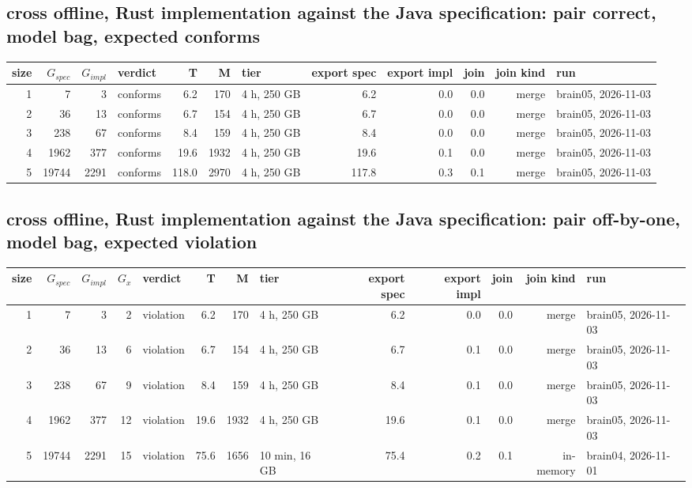 \documentclass[10pt]{article}
\begin{document}
\subsection*{cross offline, Rust implementation against the Java specification: pair \textsf{correct}, model bag, expected conforms}
\begin{longtable}{@{}rrrlrrlrrrrl@{}}
\toprule
size & $G_{\mathit{spec}}$ & $G_{\mathit{impl}}$ & verdict & T & M & tier & export spec & export impl & join & join kind & run \\
\midrule
\endhead
\color{blue} 1 & 7 & 3 & conforms & 6.2 & 170 & 4 h, 250 GB & 6.2 & 0.0 & 0.0 & merge & brain05, 2026-11-03 \\
\color{blue} 2 & 36 & 13 & conforms & 6.7 & 154 & 4 h, 250 GB & 6.7 & 0.0 & 0.0 & merge & brain05, 2026-11-03 \\
\color{blue} 3 & 238 & 67 & conforms & 8.4 & 159 & 4 h, 250 GB & 8.4 & 0.0 & 0.0 & merge & brain05, 2026-11-03 \\
\color{blue} 4 & 1962 & 377 & conforms & 19.6 & 1932 & 4 h, 250 GB & 19.6 & 0.1 & 0.0 & merge & brain05, 2026-11-03 \\
\color{blue} 5 & 19744 & 2291 & conforms & 118.0 & 2970 & 4 h, 250 GB & 117.8 & 0.3 & 0.1 & merge & brain05, 2026-11-03 \\
\bottomrule
\end{longtable}
\subsection*{cross offline, Rust implementation against the Java specification: pair \textsf{off-by-one}, model bag, expected violation}
\begin{longtable}{@{}rrrrlrrlrrrrl@{}}
\toprule
size & $G_{\mathit{spec}}$ & $G_{\mathit{impl}}$ & $G_x$ & verdict & T & M & tier & export spec & export impl & join & join kind & run \\
\midrule
\endhead
\color{blue} 1 & 7 & 3 & 2 & violation & 6.2 & 170 & 4 h, 250 GB & 6.2 & 0.0 & 0.0 & merge & brain05, 2026-11-03 \\
\color{blue} 2 & 36 & 13 & 6 & violation & 6.7 & 154 & 4 h, 250 GB & 6.7 & 0.1 & 0.0 & merge & brain05, 2026-11-03 \\
\color{blue} 3 & 238 & 67 & 9 & violation & 8.4 & 159 & 4 h, 250 GB & 8.4 & 0.1 & 0.0 & merge & brain05, 2026-11-03 \\
\color{blue} 4 & 1962 & 377 & 12 & violation & 19.6 & 1932 & 4 h, 250 GB & 19.6 & 0.1 & 0.0 & merge & brain05, 2026-11-03 \\
\color{red} 5 & 19744 & 2291 & 15 & violation & 75.6 & 1656 & 10 min, 16 GB & 75.4 & 0.2 & 0.1 & in-memory & brain04, 2026-11-01 \\
\bottomrule
\end{longtable}
\end{document}
